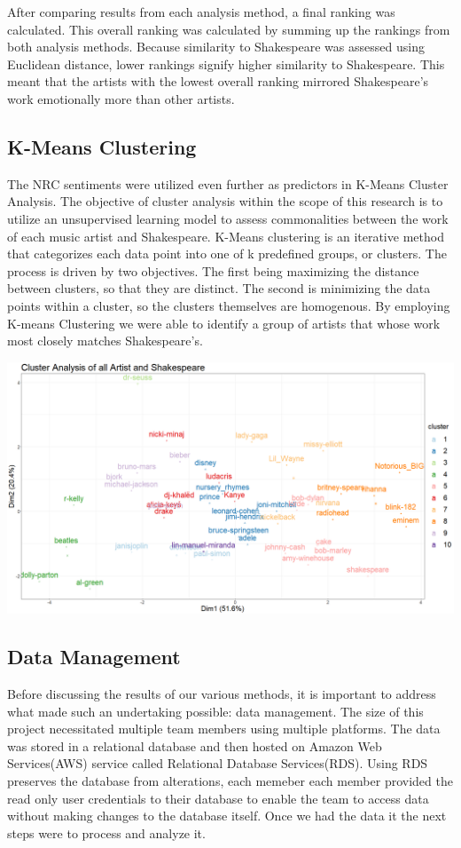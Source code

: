 \documentclass[11pt]{article}
\begin{document}
\noindent After comparing results from each analysis method, a final ranking was calculated. This overall ranking was calculated by summing up the rankings from both analysis methods. Because similarity to Shakespeare was assessed using Euclidean distance, lower rankings signify higher similarity to Shakespeare. This meant that the artists with the lowest overall ranking mirrored Shakespeare’s work emotionally more than other artists.

\subsection{K-Means Clustering}
The NRC sentiments were utilized even further as predictors in K-Means Cluster Analysis. The objective of cluster analysis within the scope of this research is to utilize an unsupervised learning model \cite{k-means} to assess commonalities between the work of each music artist and Shakespeare. K-Means clustering is an iterative method that categorizes each data point into one of k predefined groups, or clusters. The process is driven by two objectives. The first being maximizing the distance between clusters, so that they are distinct. The second is minimizing the data points within a cluster, so the clusters themselves are homogenous. \cite{k-means} By employing K-means Clustering we were able to identify a group of artists that whose work most closely matches Shakespeare’s. 

\begin{center}
\includegraphics[width=14cm]{_assets/ClusterAnalysis_Fit10.png}
\end{center}

\subsection{Data Management}
Before discussing the results of our various methods, it is important to address what made such an undertaking possible: data management.  The size of this project necessitated multiple team members using multiple platforms. The data was stored in a relational database and then hosted on  Amazon Web Services(AWS) service called Relational Database Services(RDS). Using RDS preserves the database from alterations, each memeber each member provided the read only user credentials to their database to enable the team to access data without making changes to the database itself. Once we had the data it the next steps were to process and analyze it. 
\end{document}
